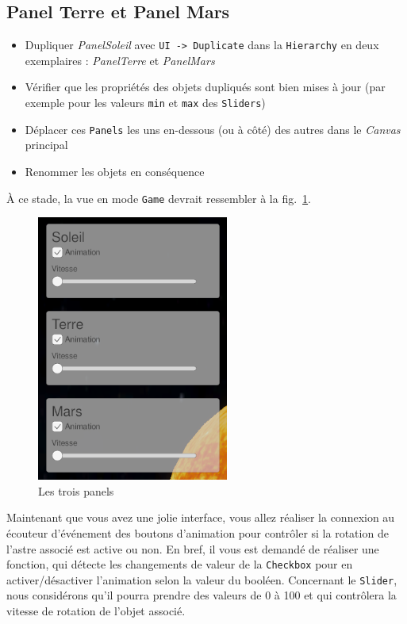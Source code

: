 \documentclass[a4paper,10pt]{article}
\newenvironment{solution}%
{\begin{tcolorbox}[breakable,colback=red!5!white,colframe=red!75!black,title=Solution]}%
{\end{tcolorbox}}
\begin{document}
\begin{solution}
\subsection{Panel Terre et Panel Mars}
\begin{itemize}
	\item Dupliquer \textit{PanelSoleil} avec \texttt{UI -> Duplicate} dans la \texttt{Hierarchy} en deux exemplaires : \textit{PanelTerre} et \textit{PanelMars}
	\item Vérifier que les propriétés des objets dupliqués sont bien mises à jour (par exemple pour les valeurs \texttt{min} et \texttt{max} des \texttt{Sliders})
	\item Déplacer ces \texttt{Panels} les uns en-dessous (ou à côté) des autres dans le \textit{Canvas} principal
	\item Renommer les objets en conséquence
\end{itemize}

À ce stade, la vue en mode \texttt{Game} devrait ressembler à la fig.~\ref{fig:trois-panels}.
\end{solution}

\newpage 
\begin{figure}[h]
		\begin{center}
			\includegraphics[width=.3\textwidth]{fig/trois-panels}
			\caption{Les trois panels}
			\label{fig:trois-panels}
		\end{center}
\end{figure}

\fi 


Maintenant que vous avez une jolie interface, vous allez réaliser la connexion au écouteur d'événement des boutons d'animation pour contrôler si la rotation de l'astre associé est active ou non. En bref, il vous est demandé de réaliser une fonction, qui détecte les changements de valeur de la \texttt{Checkbox} pour en activer/désactiver l'animation selon la valeur du booléen. 
Concernant le \texttt{Slider}, nous considérons qu'il pourra prendre des valeurs de 0 à 100 et qui contrôlera la vitesse de rotation de l'objet associé.
\end{document}
